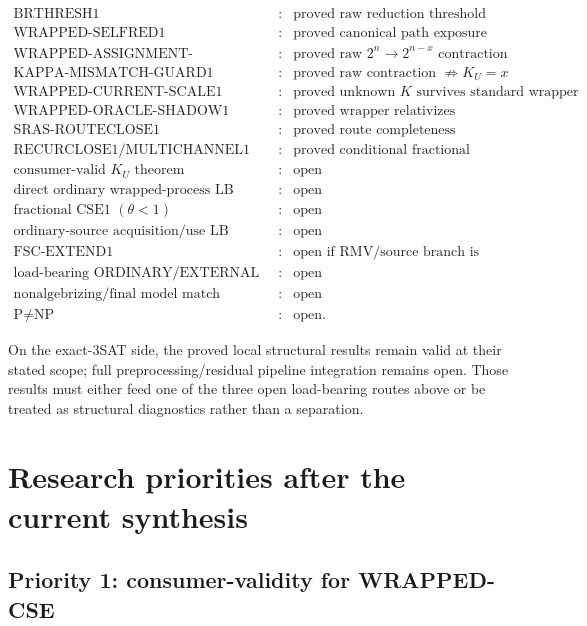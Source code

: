 \documentclass[11pt]{article}
\theoremstyle{plain}
\theoremstyle{definition}
\theoremstyle{remark}
\begin{document}
\[
\boxed{
\begin{array}{rcl}
\text{BRTHRESH1} &:& \text{proved raw reduction threshold}\\
\text{WRAPPED-SELFRED1} &:& \text{proved canonical path exposure}\\
\text{WRAPPED-ASSIGNMENT-CONTRACTION1} &:& \text{proved raw }2^n\to2^{n-x}\text{ contraction}\\
\text{KAPPA-MISMATCH-GUARD1} &:& \text{proved raw contraction }\not\Rightarrow K_U=x\\
\text{WRAPPED-CURRENT-SCALE1} &:& \text{proved unknown }K\text{ survives standard wrapper}\\
\text{WRAPPED-ORACLE-SHADOW1} &:& \text{proved wrapper relativizes}\\
\text{SRAS-ROUTECLOSE1} &:& \text{proved route completeness}\\
\text{RECURCLOSE1/MULTICHANNEL1} &:& \text{proved conditional fractional closure}\\
\text{consumer-valid }K_U\text{ theorem} &:& \text{open}\\
\text{direct ordinary wrapped-process LB} &:& \text{open}\\
\text{fractional CSE1 }(\theta<1) &:& \text{open}\\
\text{ordinary-source acquisition/use LB} &:& \text{open}\\
\text{FSC-EXTEND1} &:& \text{open if RMV/source branch is used}\\
\text{load-bearing ORDINARY/EXTERNAL theorem} &:& \text{open}\\
\text{nonalgebrizing/final model match} &:& \text{open}\\
\text{P}\ne\text{NP} &:& \text{open}.
\end{array}}
\]

On the exact-3SAT side, the proved local structural results remain valid at
their stated scope; full preprocessing/residual pipeline integration remains
open.  Those results must either feed one of the three open load-bearing
routes above or be treated as structural diagnostics rather than a separation.

\section{Research priorities after the current synthesis}

\subsection{Priority 1: consumer-validity for WRAPPED-CSE}
\end{document}
